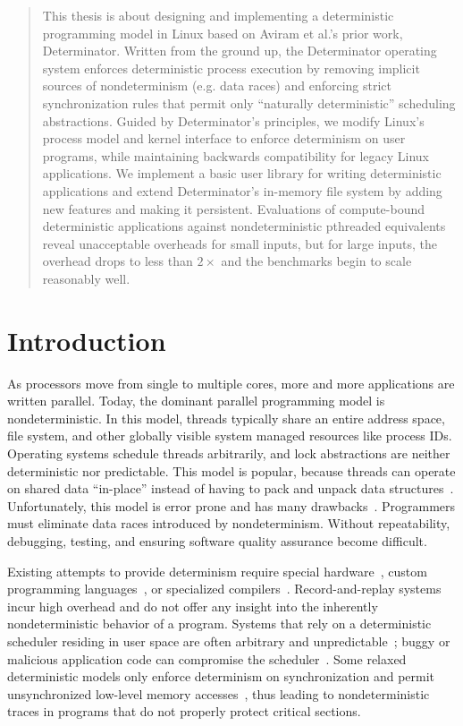 
\begin{abstract}
This thesis is about designing and implementing a deterministic programming
model in Linux based on Aviram et al.'s prior work, Determinator. Written from
the ground up, the Determinator operating system enforces deterministic process
execution by
removing implicit sources of nondeterminism (e.g. data races) and enforcing
strict synchronization rules that permit only ``naturally deterministic''
scheduling abstractions. Guided by Determinator's principles, we modify
Linux's process model and kernel interface to enforce determinism on user
programs, while maintaining backwards compatibility for legacy Linux
applications. We implement a basic user library for writing deterministic
applications and extend Determinator's in-memory file system by adding new
features and making it persistent. Evaluations of compute-bound deterministic
applications against nondeterministic pthreaded equivalents reveal unacceptable
overheads for small inputs, but for large inputs, the overhead drops to less
than $2\times$ and the benchmarks begin to scale reasonably well.

\end{abstract}

\section{Introduction}
As processors move from single to multiple cores, more and more applications are
written parallel. Today, the dominant parallel programming model is
nondeterministic. In this model, threads typically share an entire address
space, file system, and other globally visible system managed resources like
process IDs. Operating systems schedule threads arbitrarily, and
lock abstractions are neither deterministic nor predictable. This model is
popular, because threads can operate on shared data ``in-place'' instead of
having to pack and unpack data structures~\cite{Aviram10}. Unfortunately, this
model is error prone and has many drawbacks~\cite{artho2003high,lee2006problem,
lu2008learning}. Programmers must eliminate data races introduced by
nondeterminism. Without repeatability, debugging, testing, and ensuring
software quality assurance become difficult.

Existing attempts to provide determinism require
special hardware~\cite{Devietti09,devietti2011rcdc}, custom programming
languages~\cite{bocchino2009type}, or specialized
compilers~\cite{bergan2010coredet}. Record-and-replay
systems~\cite{leblanc1987debugging,montesinos2008delorean} incur high
overhead and do not offer any insight into the inherently nondeterministic
behavior of a program. Systems that rely on a deterministic
scheduler residing in user space are often arbitrary and
unpredictable~\cite{olszewski2009kendo}; buggy or malicious application code
can compromise the scheduler~\cite{Aviram10,cui2010stable}.  Some relaxed
deterministic models only enforce determinism on synchronization and permit
unsynchronized low-level memory accesses~\cite{olszewski2009kendo}, thus leading
to nondeterministic traces in programs that do not properly protect critical
sections.

